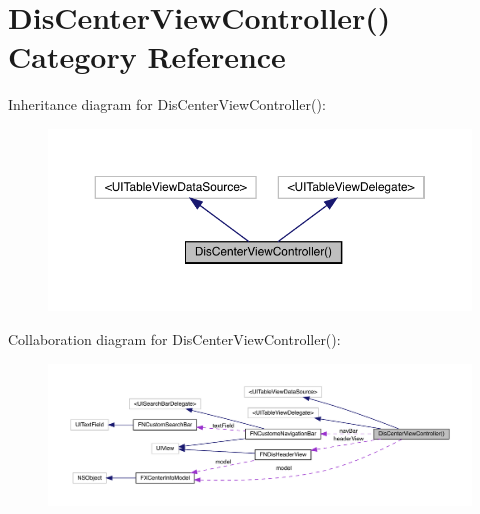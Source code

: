 \hypertarget{category_dis_center_view_controller_07_08}{}\section{Dis\+Center\+View\+Controller() Category Reference}
\label{category_dis_center_view_controller_07_08}


Inheritance diagram for Dis\+Center\+View\+Controller()\+:\nopagebreak
\begin{figure}[H]
\begin{center}
\leavevmode
\includegraphics[width=350pt]{category_dis_center_view_controller_07_08__inherit__graph}
\end{center}
\end{figure}


Collaboration diagram for Dis\+Center\+View\+Controller()\+:\nopagebreak
\begin{figure}[H]
\begin{center}
\leavevmode
\includegraphics[width=350pt]{category_dis_center_view_controller_07_08__coll__graph}
\end{center}
\end{figure}
